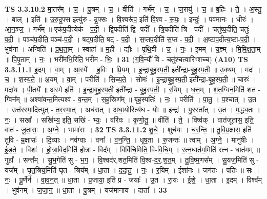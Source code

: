 \documentclass[17pt]{extarticle}
\begin{document}
                  \newline
                                \textbf{ TS 3.3.10.2} \newline
                  मा॒तर᳚म् । च॒ । पु॒त्रम् । च॒ । वीति॑ । गर्भ᳚म् । च॒ । ज॒रायु॑ । च॒ ॥ ब॒हिः । ते॒ । अ॒स्तु॒ । बाल् । इति॑ ॥ उ॒रु॒द्र॒फ्स इत्यु॑रु - द्र॒फ्सः । वि॒श्वरू॑प॒ इति॑ वि॒श्व - रू॒पः॒ । इन्दुः॑ । पव॑मानः । धीरः॑ । आ॒न॒ञ्ज॒ । गर्भ᳚म् ॥ एक॑प॒दीत्येक॑ - प॒दी॒ । द्वि॒पदीति॑ द्वि- पदी᳚ । त्रि॒पदीति॑ त्रि - पदी᳚ । चतु॑ष्प॒दीति॒ चतुः॑ - प॒दी॒ । पञ्च॑प॒दीति॒ पञ्च॑-प॒दी॒ । षट्प॒दीति॒ षट् - प॒दी॒ । स॒प्तप॒दीति॑ स॒प्त - प॒दी॒ । अ॒ष्टाप॒दीत्य॒ष्टा-प॒दी॒ । भुव॑ना । अन्विति॑ । प्र॒थ॒ता॒म् । स्वाहा᳚ ॥ म॒ही । द्यौः । पृ॒थि॒वी । च॒ । नः॒ । इ॒मम् । य॒ज्ञ्म् । मि॒मि॒क्ष॒ता॒म् ॥ पि॒पृ॒ताम् । नः॒ । भरी॑मभि॒रिति॒ भरी॑म - भिः॒ ॥ \textbf{  31} \newline
                  \newline
                      (ग॒वि॒न्यौ॑ वि - चतु॑श्चत्वारिꣳशच्च)  \textbf{(A10)} \newline \newline
                                \textbf{ TS 3.3.11.1} \newline
                  इ॒दम् । वा॒म् । आ॒स्ये᳚ । ह॒विः । प्रि॒यम् । इ॒न्द्रा॒बृ॒ह॒स्प॒ती॒ इती᳚न्द्रा-बृ॒ह॒स्प॒ती॒ ॥ उ॒क्थम् । मदः॑ । च॒ । श॒स्य॒ते॒ ॥ अ॒यम् । वा॒म् । परीति॑ । सि॒च्य॒ते॒ । सोमः॑ । इ॒न्द्रा॒बृ॒ह॒स्प॒ती॒ इती᳚न्द्रा-बृ॒ह॒स्प॒ती॒ ॥ चारुः॑ । मदा॑य । पी॒तये᳚ ॥ अ॒स्मे इति॑ । इ॒न्द्रा॒बृ॒ह॒स्प॒ती॒ इती᳚न्द्रा - बृ॒ह॒स्प॒ती॒ । र॒यिम् । ध॒त्त॒म् । श॒त॒ग्विन॒मिति॑ शत - ग्विन᳚म् ॥ अश्वा॑वन्त॒मित्यश्व॑ - व॒न्त॒म् । स॒ह॒स्रिण᳚म् ॥ बृह॒स्पतिः॑ । नः॒ । परीति॑ । पा॒तु॒ । प॒श्चात् । उ॒त । उत्त॑रस्मा॒दित्युत् - त॒र॒स्मा॒त् । अध॑रात् । अ॒घा॒योरित्य॑घ - योः ॥ इन्द्रः॑ । पु॒रस्ता᳚त् । उ॒त । म॒द्ध्य॒तः । नः॒ । सखा᳚ । सखि॑भ्य॒ इति॒ सखि॑ - भ्यः॒ । वरि॑वः । कृ॒णो॒तु॒ ॥ वीति॑ । ते॒ । विष्व॑क् । वात॑जूतास॒ इति॒ वात॑ - जू॒ता॒सः॒ । अ॒ग्ने॒ । भामा॑सः । \textbf{  32} \newline
                  \newline
                                \textbf{ TS 3.3.11.2} \newline
                  शु॒चे॒ । शुच॑यः । च॒र॒न्ति॒ ॥ तु॒वि॒म्र॒क्षास॒ इति॑ तुवि - म्र॒क्षासः॑ । दि॒व्याः । नव॑ग्वाः । वना᳚ । व॒न॒न्ति॒ । धृ॒ष॒ता । रु॒जन्तः॑ ॥ त्वाम् । अ॒ग्ने॒ । मानु॑षीः । ई॒ड॒ते॒ । विशः॑ । हो॒त्रा॒विद॒मिति॑ होत्रा - विद᳚म् । विवि॑चि॒मिति॒ वि-वि॒चि॒म् । र॒त्न॒धात॑म॒मिति॑ रत्न - धात॑मम् ॥ गुहा᳚ । सन्त᳚म् । सु॒भ॒गेति॑ सु - भ॒ग॒ । वि॒श्वद॑र्.शत॒मिति॑ वि॒श्व-द॒र॒.श॒त॒म् । तु॒वि॒ष्म॒णस᳚म् । सु॒यज॒मिति॑ सु - यज᳚म् । घृ॒त॒श्रिय॒मिति॑ घृत - श्रिय᳚म् ॥ धा॒ता । द॒दा॒तु॒ । नः॒ । र॒यिम् । ईशा॑नः । जग॑तः । पतिः॑ ॥ सः । नः॒ । पू॒र्णेन॑ । वा॒व॒न॒त् ॥ धा॒ता । प्र॒जाया॒ इति॑ प्र - जयाः᳚ । उ॒त । रा॒यः । ई॒शे॒ । धा॒ता । इ॒दम् । विश्व᳚म् । भुव॑नम् । ज॒जा॒न॒ ॥ धा॒ता । पु॒त्रम् । यज॑मानाय । दाता᳚ । \textbf{  33} \newline
\end{document}
